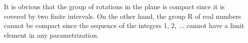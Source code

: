It is obvious that the group of rotations in the plane is compact since it is covered by two finite intervals. On the other hand, the group R of real numbers cannot be compact since the sequence of the integers 1, 2, ... cannot have a limit element in any parametrization.

\endinput  %